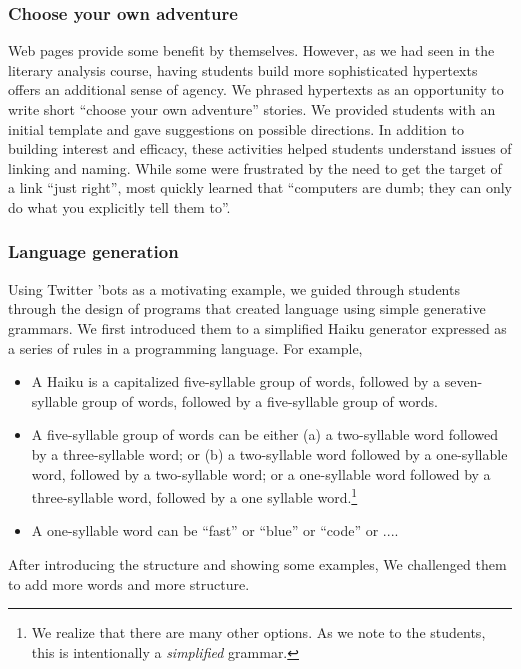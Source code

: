 \subsubsection{Choose your own adventure}

Web pages provide some benefit by themselves.  However, as we had seen
in the literary analysis course, having students build more sophisticated
hypertexts offers an additional sense of agency.  We phrased hypertexts
as an opportunity to write short ``choose your own adventure'' stories.
We provided students with an initial template and gave suggestions on
possible directions.  In addition to building interest and efficacy, these
activities helped students understand issues of linking and naming.
While some were frustrated by the need to get the target of a link
``just right'', most quickly learned that ``computers are dumb; they
can only do what you explicitly tell them to''.

\subsubsection{Language generation}

Using Twitter 'bots as a motivating example, we guided through
students through the design of programs that created language
using simple generative grammars.  We first introduced them to a
simplified Haiku generator expressed as a series of rules in a
programming language.  For example,

\begin{itemize}
\item A Haiku is a capitalized five-syllable group of words, followed
  by a seven-syllable group of words, followed by a five-syllable
  group of words.
\item A five-syllable group of words can be either (a) a two-syllable
  word followed by a three-syllable word; or (b) a two-syllable word
  followed by a one-syllable word, followed by a two-syllable word;
  or a one-syllable word followed by a three-syllable word, followed
  by a one syllable word.\footnote{We realize that there are many
  other options.  As we note to the students, this is intentionally
  a \textit{simplified} grammar.}
\item A one-syllable word can be ``fast'' or ``blue'' or ``code'' or ....
\end{itemize}

After introducing the structure and showing some examples, We
challenged them to add more words and more structure.

